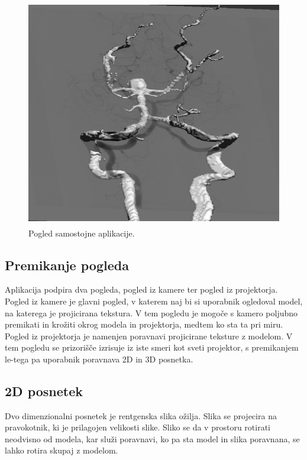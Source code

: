 \documentclass[a4paper, 12pt]{book}
\begin{document}
\begin{figure}[h]
\begin{center}
\includegraphics[width=12cm, height=10cm, keepaspectratio=true]{Samostojna_aplikacija.png}
\end{center}
\caption{Pogled samostojne aplikacije.}
\label{samostojnaaplikacija}
\end{figure}

\subsection*{Premikanje pogleda}

Aplikacija podpira dva pogleda, pogled iz kamere ter pogled iz projektorja. Pogled iz kamere je glavni pogled, v katerem naj bi si uporabnik ogledoval model, na katerega je projicirana tekstura. V tem pogledu je mogoče s kamero poljubno premikati in krožiti okrog modela in projektorja, medtem ko sta ta pri miru. Pogled iz projektorja je namenjen poravnavi projicirane teksture z modelom. V tem pogledu se prizorišče izrisuje iz iste smeri kot sveti projektor, s premikanjem le-tega pa uporabnik poravnava 2D in 3D posnetka.

\subsection*{2D posnetek}

Dvo dimenzionalni posnetek je rentgenska slika ožilja. Slika se projecira na pravokotnik, ki je prilagojen velikosti slike. Sliko se da v prostoru rotirati neodvisno od modela, kar služi poravnavi, ko pa sta model in slika poravnana, se lahko rotira skupaj z modelom.
\end{document}
